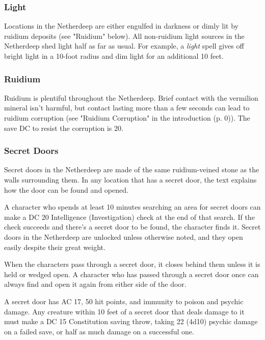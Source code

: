 \documentclass[a4paper, 11pt, bg=full, twocolumn, nooutline]{dndbook}
\begin{document}

\subsubsection{Light}

Locations in the Netherdeep are either engulfed in darkness or dimly lit by ruidium deposits (see "Ruidium" below). All non-ruidium light sources in the Netherdeep shed light half as far as usual. For example, a \textit{light} spell gives off bright light in a 10-foot radius and dim light for an additional 10 feet.

\subsubsection{Ruidium}

Ruidium is plentiful throughout the Netherdeep. Brief contact with the vermilion mineral isn't harmful, but contact lasting more than a few seconds can lead to ruidium corruption (see "Ruidium Corruption" in the introduction (p. 0)). The save DC to resist the corruption is 20.

\subsubsection{Secret Doors}

Secret doors in the Netherdeep are made of the same ruidium-veined stone as the walls surrounding them. In any location that has a secret door, the text explains how the door can be found and opened.

A character who spends at least 10 minutes searching an area for secret doors can make a DC 20 Intelligence (Investigation) check at the end of that search. If the check succeeds and there's a secret door to be found, the character finds it. Secret doors in the Netherdeep are unlocked unless otherwise noted, and they open easily despite their great weight.

When the characters pass through a secret door, it closes behind them unless it is held or wedged open. A character who has passed through a secret door once can always find and open it again from either side of the door.

A secret door has AC 17, 50 hit points, and immunity to poison and psychic damage. Any creature within 10 feet of a secret door that deals damage to it must make a DC 15 Constitution saving throw, taking 22 (4d10) psychic damage on a failed save, or half as much damage on a successful one.
\end{document}
